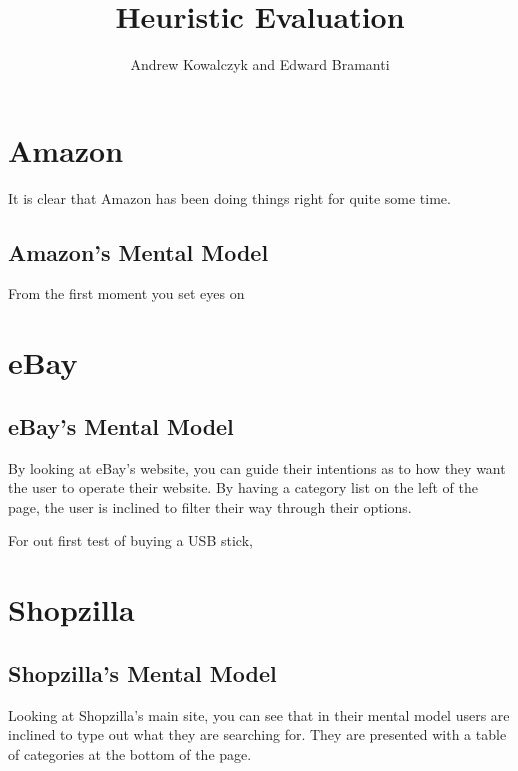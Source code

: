 \documentclass[11pt, oneside]{article}   	%
\title{Heuristic Evaluation}
\author{Andrew Kowalczyk and Edward Bramanti}
\begin{document}
\maketitle

\section{Amazon}

It is clear that Amazon has been doing things right for quite some time.

\subsection{Amazon's Mental Model}

From the first moment you set eyes on

\section{eBay}

\subsection{eBay's Mental Model}

By looking at eBay's website, you can guide their intentions as to how they want the user to operate their website. By having a category list on the left of the page, the user is inclined to filter their way through their options.

For out first test of buying a USB stick, 

\section{Shopzilla}

\subsection{Shopzilla's Mental Model}

Looking at Shopzilla's main site, you can see that in their mental model users are inclined to type out what they are searching for. They are presented with a table of categories at the bottom of the page.
\end{document}
